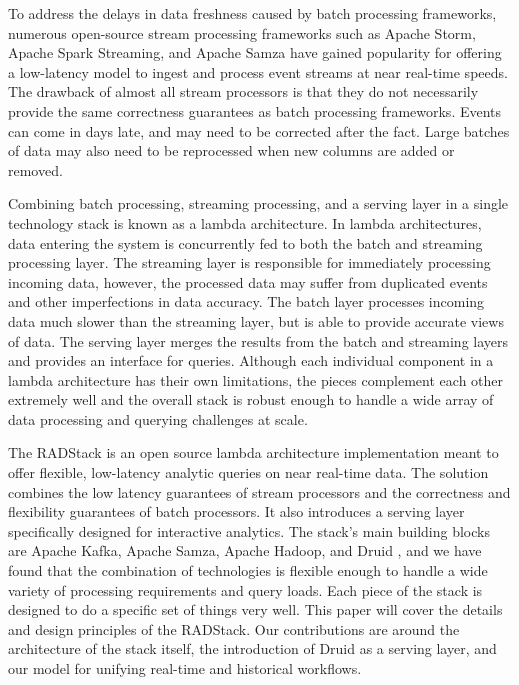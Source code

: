 \documentclass{vldb}
\begin{document}
To address the delays in data freshness caused by batch processing
frameworks, numerous open-source stream processing frameworks such as Apache
Storm\cite{marz2013storm}, Apache Spark Streaming\cite{zaharia2012discretized},
and Apache Samza\cite{2014samza} have gained popularity for offering a
low-latency model to ingest and process event streams at near real-time speeds.
The drawback of almost all stream processors is that they do not
necessarily provide the same correctness guarantees as batch processing
frameworks. Events can come in days late, and may need to be corrected after
the fact. Large batches of data may also need to be reprocessed when new
columns are added or removed.

Combining batch processing, streaming processing, and a serving layer in a
single technology stack is known as a lambda
architecture\cite{hausenblas2014lambda}. In lambda architectures, data entering
the system is concurrently fed to both the batch and streaming processing
layer. The streaming layer is responsible for immediately processing incoming
data, however, the processed data may suffer from duplicated events and other
imperfections in data accuracy. The batch layer processes incoming data much
slower than the streaming layer, but is able to provide accurate views of data.
The serving layer merges the results from the batch and streaming layers and
provides an interface for queries. Although each individual component in a
lambda architecture has their own limitations, the pieces complement each other
extremely well and the overall stack is robust enough to handle a wide array of
data processing and querying challenges at scale. 

The RADStack is an open source lambda architecture implementation meant to offer flexible,
low-latency analytic queries on near real-time data. The solution combines the
low latency guarantees of stream processors and the correctness and flexibility
guarantees of batch processors. It also introduces a serving layer specifically
designed for interactive analytics. The stack’s main building blocks are Apache
Kafka\cite{kreps2011kafka}, Apache Samza, Apache Hadoop, and Druid
\cite{yang2014druid}, and we have found that the combination of technologies is
flexible enough to handle a wide variety of processing requirements and query
loads. Each piece of the stack is designed to do a specific set of things very
well. This paper will cover the details and design principles of the RADStack.
Our contributions are around the architecture of the stack itself, the
introduction of Druid as a serving layer, and our model for unifying real-time
and historical workflows.
\end{document}
